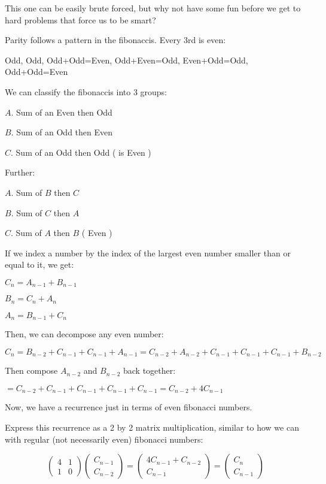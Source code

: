This one can be easily brute forced, but why not have some fun before we get to hard problems that force us to be smart?

Parity follows a pattern in the fibonaccis. Every 3rd is even:

Odd, Odd, Odd+Odd=Even, Odd+Even=Odd, Even+Odd=Odd, Odd+Odd=Even

We can classify the fibonaccis into 3 groups:

$ A $. Sum of an Even then Odd

$ B $. Sum of an Odd then Even

$ C $. Sum of an Odd then Odd ( is Even )

Further:

$ A $. Sum of $ B $ then $ C $

$ B $. Sum of $ C $ then $ A $

$ C $. Sum of $ A $ then $ B $ ( Even )

If we index a number by the index of the largest even number smaller than or equal to it, we get:

$ C_n = A_{n-1} + B_{n-1} $

$ B_n = C_n + A_n $

$ A_n = B_{n-1} + C_n $

Then, we can decompose any even number:

$ C_n = B_{n-2} + C_{n-1} + C_{n-1} + A_{n-1}
= C_{n-2} + A_{n-2} + C_{n-1} + C_{n-1} + C_{n-1} + B_{n-2} $

Then compose $ A_{n-2} $ and $ B_{n-2} $ back together:

$ = C_{n-2} + C_{n-1} + C_{n-1} + C_{n-1} + C_{n-1} = C_{n-2} + 4C_{n-1} $

Now, we have a recurrence just in terms of even fibonacci numbers.

Express this recurrence as a 2 by 2 matrix multiplication, similar to how we can with regular (not necessarily even) fibonacci numbers:

$$
\begin{pmatrix}
4 & 1 \\
1 & 0
\end{pmatrix}
\begin{pmatrix}
C_{n-1} \\
C_{n-2}
\end{pmatrix}
=
\begin{pmatrix}
4C_{n-1} + C_{n-2}  \\
C_{n-1}
\end{pmatrix}
=
\begin{pmatrix}
C_n  \\
C_{n-1}
\end{pmatrix}
$$

